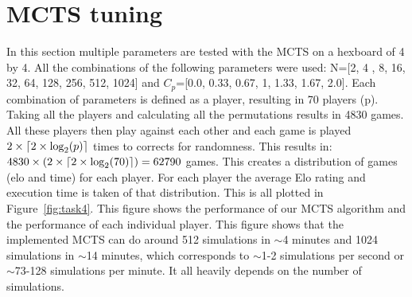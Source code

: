 \documentclass{article}
\DeclarePairedDelimiter\ceil{\lceil}{\rceil}
\begin{document}

\newpage

\section{MCTS tuning}
In this section multiple parameters are tested with the MCTS on a hexboard of 4 by 4. All the combinations of the following parameters were used: N=[2, 4 , 8, 16, 32, 64, 128, 256, 512, 1024] and $C_p$=[0.0, 0.33, 0.67, 1, 1.33, 1.67, 2.0]. Each combination of parameters is defined as a player, resulting in 70 players (p). Taking all the players and calculating all the permutations results in 4830 games. All these players then play against each other  and each game is played $2 \times \ceil*{2 \times \log_2(p)} $ times to corrects for randomness. This results in: $4830 \times (2 \times \ceil*{2 \times \log_2(70)}) = 62790 $ games. This creates a distribution of games (elo and time) for each player. For each player the average Elo rating and execution time is taken of that distribution. This is all plotted in Figure~\ref{fig:task4}. This figure shows the performance of our MCTS algorithm and the performance of each individual player. This figure shows that the implemented MCTS can do around 512 simulations in $\sim$4 minutes and 1024 simulations in $\sim$14 minutes, which corresponds to $\sim$1-2 simulations per second or $\sim$73-128 simulations per minute. It all heavily depends on the number of simulations.
\end{document}
